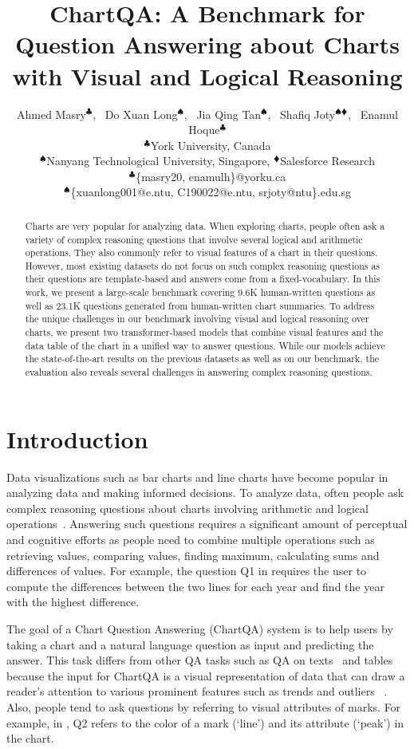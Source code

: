 \documentclass[11pt]{article}
\title{ChartQA: A Benchmark for Question Answering about Charts \\with Visual and Logical Reasoning}
\author{
Ahmed Masry$^{\clubsuit}$, \  Do Xuan Long$^{\spadesuit}$, \ Jia Qing Tan$^{\spadesuit}$,  \ Shafiq Joty$^{\spadesuit\vardiamondsuit}$, \ Enamul Hoque$^{\clubsuit}$\\
$^\clubsuit$York University, Canada \\
$^\spadesuit$Nanyang Technological University, Singapore, $^\vardiamondsuit$Salesforce Research 
\\
$^\clubsuit$\{masry20, enamulh\}@yorku.ca\\
$^\spadesuit$\{xuanlong001@e.ntu, C190022@e.ntu, srjoty@ntu\}.edu.sg 
}
\begin{document}
\maketitle




\begin{abstract} Charts are very popular for analyzing data. When exploring charts, people often ask a variety of complex reasoning questions that involve several logical and arithmetic operations. They also commonly refer to visual features of a chart in their questions. However, most existing datasets do not focus on such 
complex reasoning questions as their questions are template-based and answers come from a fixed-vocabulary. In this work, we present a large-scale benchmark covering 9.6K human-written questions as well as 23.1K questions generated from human-written chart summaries. To address the unique challenges in our benchmark involving visual and logical reasoning over charts, we present two transformer-based models that combine visual features and the data table of the chart in a unified way to answer questions. While our models achieve the state-of-the-art results on the previous datasets as well as on our benchmark, the evaluation also reveals several challenges in answering complex reasoning questions.

\end{abstract}

\section{Introduction}


Data visualizations such as bar charts and line charts have become popular in analyzing data and making informed decisions. To analyze data, often people ask complex reasoning questions about charts involving arithmetic and logical operations~\cite{kim2020answering}. Answering such questions requires   
a significant amount of perceptual and cognitive efforts  as people need to combine multiple operations such as retrieving values, comparing values, finding maximum, calculating sums and differences 
of values. For example, the question Q1 in  requires the user to compute the differences between the two lines for each year and find the year with the highest difference.

The goal of a Chart Question Answering (ChartQA) system is to help users by taking a chart and a natural language question as input and predicting the answer. %
This task differs from other  QA tasks such as QA on texts~\cite{squadv1} and tables~\cite{sempre} because the input for ChartQA is a visual representation of data 
that can draw a reader’s attention to various prominent features such as trends and outliers ~\cite{kim2020answering,kim2021towards}. Also, people tend to ask questions by referring to visual attributes of marks. For example, in , Q2 
refers to the color of a mark (`line') and its attribute (`peak') in the chart.
\end{document}
